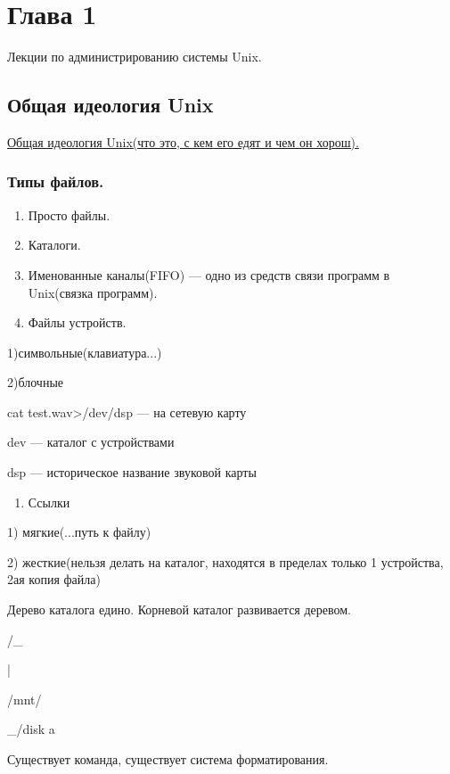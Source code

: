 \chapter { Глава 1 }
Лекции по администрированию системы Unix.

\section { Общая идеология Unix }
\par \underline{Общая идеология Unix(что это, с кем его едят и чем он хорош).}
\subsection {Типы файлов.}
\begin{enumerate}
	\item \par Просто
	файлы.
	\item \par Каталоги.
	\item \par Именованные
	каналы(FIFO) — одно из средств связи
	программ в Unix(связка программ).
	\item \par Файлы
	устройств.
\end{enumerate}
\par 
1)символьные(клавиатура...)
\par 
2)блочные
\par  cat
test.wav>/dev/dsp — на сетевую карту
\par  dev —
каталог с устройствами
\par  dsp —
историческое название звуковой карты
\begin{enumerate}
	\item \par Ссылки
\end{enumerate}
\par 
1) мягкие(...путь к файлу)
\par 
2) жесткие(нельзя делать на каталог,
находятся в пределах только 1 устройства,
2ая копия файла)
\par  Дерево
каталога едино. Корневой каталог
развивается деревом.
\par   /\_
\par     |
\par     /mnt/
\par            
\_/disk a
\par  Существует
команда, существует система форматирования.

